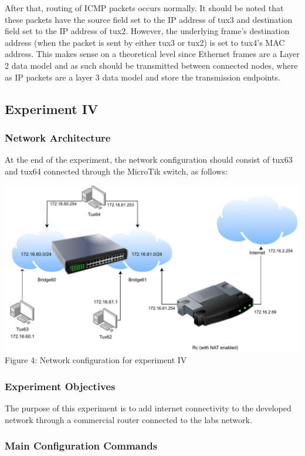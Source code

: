 \documentclass[11pt,a4paper,twocolumn]{article}
\begin{document}
After that, routing of ICMP packets occurs normally. It should be noted that these packets have the source field set to the IP address of tux3 and destination field set to the IP address of tux2. However, the underlying frame's destination address (when the packet is sent by either tux3 or tux2) is set to tux4's MAC address.
This makes sense on a theoretical level since Ethernet frames are a Layer 2 data model and as such should be transmitted between connected nodes, where as IP packets are a layer 3 data model and store the transmission endpoints.
\subsection{Experiment IV}

\subsubsection{Network Architecture}

At the end of the experiment, the network configuration should consist of tux63 and tux64 connected through the MicroTik switch, as follows:

\includegraphics{experiment4}
Figure 4: Network configuration for experiment IV
\subsubsection{Experiment Objectives}

The purpose of this experiment is to add internet connectivity to the developed network through a commercial router connected to the labs network.

\subsubsection{Main Configuration Commands}
\end{document}
